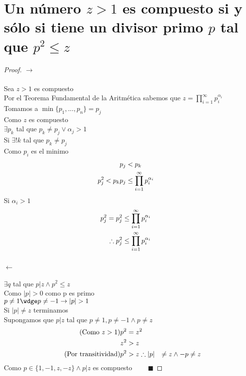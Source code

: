 \section{Un número $z > 1$ es compuesto si y sólo si tiene un divisor primo $p$ tal que $p^2 \leq z$}
    \begin{proof}
        $\rightarrow$ \\ \\
        Sea $z > 1$ es compuesto \\
        Por el Teorema Fundamental de la Aritmética sabemos que $z = \displaystyle \prod_{i = 1}^{\infty} p_i^{\alpha_i}$ \\
        Tomamos a $\min\{p_1,...,p_n\}= p_j$ \\
        Como $z$ es compuesto \\
        $\exists p_k$ tal que $p_k \neq p_j \vee \alpha_j > 1$ \\
        Si $\exists ! k$ tal que $p_k \neq p_j$ \\
        Como $p_i$ es el minimo 
        \begin{align}
            \notag p_j &< p_k \\
            \notag p_j^2 < p_kp_j &\leq \prod_{i = 1}^{\infty} p_i^{\alpha_i}
        \end{align}
        Si $\alpha_i > 1$
        \begin{align}
            \notag p_j^2 = p_j^2 &\leq \prod_{i = 1}^{\infty} p_i^{\alpha_i} \\
            \notag \therefore p_j^2 &\leq  \prod_{i = 1}^{\infty} p_i^{\alpha_i}
        \end{align}
        \\ $\leftarrow$ \\ \\
        $\exists q$ tal que $p|z \wedge p^2 \leq z$ \\
        Como $|p| > 0$ como p es primo \\
        $p \neq 1 \wdge p \neq -1 \rightarrow |p| > 1$ \\
        Si $|p| \neq z$ terminamos \\
        Supongamos que $p|z$ tal que $p \neq 1, p \neq -1 \wedge p \neq z $
        \begin{align}
            \tag{Como $z > 1$} p^2 &= z^2 \\
            \notag z^2 &> z \\
            \tag{Por transitividad} p^2 &> z
            \notag \therefore |p| &\neq z \wedge -p \neq z
        \end{align}
        Como $p \in \{1,-1,z,-z\} \wedge p|z$ es compuesto $\qquad \blacksquare$
    \end{proof}